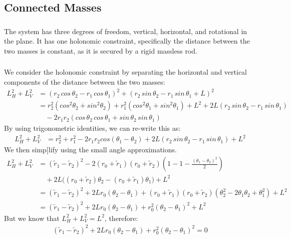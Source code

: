 \documentclass{article}
\begin{document}
\subsection{Connected Masses}

\subsubsection{} %

The system has three degrees of freedom, vertical, horizontal, and rotational in the plane. It has one holonomic constraint, specifically the distance between the two masses is constant, as it is secured by a rigid massless rod.

\subsubsection{} %

We consider the holonomic constraint by separating the horizontal and vertical components of the distance between the two masses:
\begin{align*}
	L_H^2 + L_V^2 &= (r_2\,cos\,\theta_2 - r_1 \, cos \,\theta_1)^2 + (r_2\,sin\,\theta_2 - r_1\,sin\,\theta_1 + L)^2\\
	&= r_2^2 (cos^2\theta_2 + sin^2 \theta_2) + r_1^2(cos^2\theta_1 + sin^2 \theta_1) +L^2 + 2L(r_2\,sin\,\theta_2 - r_1\,sin\,\theta_1)\\ & \quad - 2r_1r_2(cos\,\theta_2\,cos\,\theta_1 + sin\,\theta_2\,sin\,\theta_1)
\end{align*}
By using trigonometric identities, we can re-write this as:
\begin{align*}
	L_H^2 + L_V^2 &=r_2^2+r_1^2 - 2r_1r_2cos(\theta_1 - \theta_2) + 2L(r_2\,sin\,\theta_2 - r_1\,sin\,\theta_1) + L^2
\end{align*}
We then simp[lify using the small angle approximations.
\begin{align*}
	L_H^2 + L_V^2 &= (\tilde{r}_1 -\tilde{r}_2)^2 - 2(r_0+\tilde{r}_1)(r_0 + \tilde{r}_2)(1 - 1 - \frac{(\theta_1 - \theta_2)^2}{2})\\ &\quad + 2L\big((r_0 + \tilde{r}_2)\theta_2 - (r_0 + \tilde{r}_1)\theta_1 \big) + L^2\\
 &= (\tilde{r}_1 -\tilde{r}_2)^2 + 2Lr_0(\theta_2 - \theta_1) + (r_0 + \tilde{r}_1)(r_0 + \tilde{r}_2)(\theta_2^2 -2\theta_1\theta_2 + \theta_1^2) +L^2\\
&=  (\tilde{r}_1 -\tilde{r}_2)^2 + 2Lr_0(\theta_2 - \theta_1) + r_0^2(\theta_2 - \theta_1)^2 + L^2
\end{align*}
But we know that $L_H^2 + L_V^2 = L^2$, therefore:
\begin{align*}
	(\tilde{r}_1 -\tilde{r}_2)^2 + 2Lr_0(\theta_2 - \theta_1) + r_0^2(\theta_2 - \theta_1)^2 = 0
\end{align*}
\end{document}
